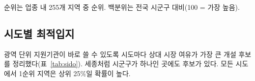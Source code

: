 \documentclass[journal,a4paper]{IEEEtran}
\begin{document}
\begin{table}[t]
\centering
\caption{점포당 수요 $G$ 상위이지만 CREDO가 보류한 지역}
\label{tab:gdiff}
{}
\vspace{2pt}

{\scriptsize 순위는 업종 내 255개 지역 중 순위. 백분위는 전국 시군구 대비(100 = 가장 높음).}
\end{table}

\subsection{시도별 최적입지}
광역 단위 지원기관이 바로 쓸 수 있도록 시도마다 상대 시장 여유가 가장 큰 개설 후보를 정리했다(표~\ref{tab:sido}). 세종처럼 시군구가 하나인 곳에도 후보가 있다. 모든 시도에서 1순위 지역은 상위 25\%일 확률이 높다.
\end{document}
